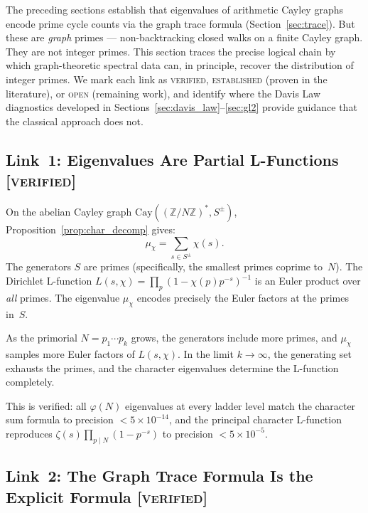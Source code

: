 \documentclass[12pt,reqno]{amsart}
\theoremstyle{plain}
\theoremstyle{definition}
\theoremstyle{remark}
\newcommand{\ZZ}{\mathbb{Z}}
\begin{document}
The preceding sections establish that eigenvalues of arithmetic Cayley
graphs encode prime cycle counts via the graph trace formula
(Section~\ref{sec:trace}).  But these are \emph{graph} primes ---
non-backtracking closed walks on a finite Cayley graph.  They are not
integer primes.  This section traces the precise logical chain by
which graph-theoretic spectral data can, in principle, recover the
distribution of integer primes.  We mark each link as
\textsc{verified}, \textsc{established} (proven in the literature), or
\textsc{open} (remaining work), and identify where the Davis Law
diagnostics developed in Sections~\ref{sec:davis_law}--\ref{sec:gl2}
provide guidance that the classical approach does not.

\subsection{Link~1: Eigenvalues Are Partial L-Functions
  \textnormal{[\textsc{verified}]}}

On the abelian Cayley graph $\mathrm{Cay}((\ZZ/N\ZZ)^*, S^\pm)$,
Proposition~\ref{prop:char_decomp} gives:
\begin{equation}\label{eq:link1}
  \mu_\chi = \sum_{s \in S^\pm} \chi(s).
\end{equation}
The generators $S$ are primes (specifically, the smallest primes
coprime to~$N$).  The Dirichlet L-function
$L(s,\chi) = \prod_p (1 - \chi(p) p^{-s})^{-1}$
is an Euler product over \emph{all} primes.  The eigenvalue
$\mu_\chi$ encodes precisely the Euler factors at the primes in~$S$.

As the primorial $N = p_1 \cdots p_k$ grows, the generators include
more primes, and $\mu_\chi$ samples more Euler factors of $L(s,\chi)$.
In the limit $k \to \infty$, the generating set exhausts the primes,
and the character eigenvalues determine the L-function completely.

This is verified: all $\varphi(N)$ eigenvalues at every ladder level
match the character sum formula to precision $< 5 \times 10^{-14}$,
and the principal character L-function reproduces $\zeta(s) \prod_{p
\mid N} (1 - p^{-s})$ to precision $< 5 \times 10^{-5}$.

\subsection{Link~2: The Graph Trace Formula Is the Explicit Formula
  \textnormal{[\textsc{verified}]}}
\end{document}
